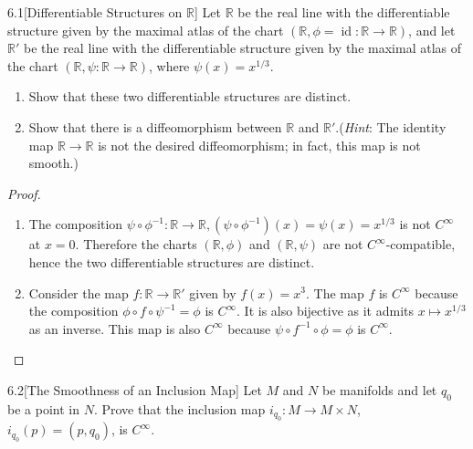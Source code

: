\begin{problem}{6.1}[Differentiable Structures on \(\mathbb{R}\)]
Let \(\mathbb{R}\) be the real line with the differentiable structure given by the maximal atlas of the chart \((\mathbb{R}, \phi = \operatorname{id} \colon \mathbb{R} \to \mathbb{R})\), and let \(\mathbb{R}'\) be the real line with the differentiable structure given by the maximal atlas of the chart \((\mathbb{R}, \psi \colon \mathbb{R} \to \mathbb{R})\), where \(\psi(x) = x^{1/3}\).

\begin{enumerate}[label={(\alph*)},leftmargin=*]
    \item Show that these two differentiable structures are distinct.
    \item Show that there is a diffeomorphism between \(\mathbb{R}\) and \(\mathbb{R}'\).\@ (\textit{Hint}: The identity map \(\mathbb{R} \to \mathbb{R}\) is not the desired diffeomorphism; in fact, this map is not smooth.)
\end{enumerate}
\end{problem}

\begin{proof}
    \begin{enumerate}[label={(\alph*)},leftmargin=*]
        \item The composition \( \psi \circ \phi^{-1}: \mathbb{R} \to \mathbb{R}, (\psi \circ \phi^{-1})(x) = \psi(x) = x^{1/3} \) is not \( C^{\infty} \) at \( x = 0 \). Therefore the charts \( (\mathbb{R}, \phi) \) and \( (\mathbb{R}, \psi) \) are not \( C^{\infty} \)-compatible, hence the two differentiable structures are distinct.
        \item Consider the map \( f: \mathbb{R} \to \mathbb{R}' \) given by \( f(x) = x^{3} \). The map \( f \) is \( C^{\infty} \) because the composition \( \phi \circ f \circ \psi^{-1} = \phi \) is \( C^{\infty} \). It is also bijective as it admits \( x \mapsto x^{1/3} \) as an inverse. This map is also \( C^{\infty} \) because \( \psi \circ f^{-1} \circ \phi = \phi \) is \( C^{\infty} \).
    \end{enumerate}
\end{proof}

\begin{problem}{6.2}[The Smoothness of an Inclusion Map]
Let \(M\) and \(N\) be manifolds and let \(q_{0}\) be a point in \(N\). Prove that the inclusion map \(i_{q_{0}}: M \to M \times N\), \(i_{q_{0}}(p) = (p, q_{0})\), is \(C^\infty\).
\end{problem}

